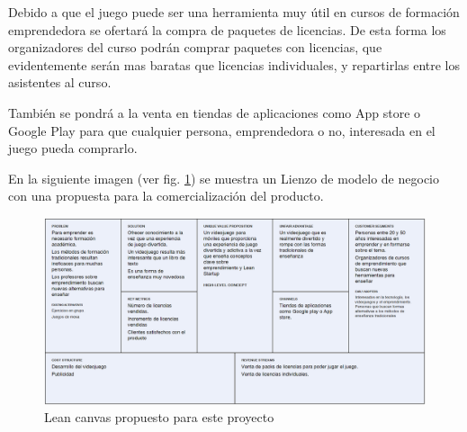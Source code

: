 Debido a que el juego puede ser una herramienta muy útil en cursos de formación emprendedora se ofertará la compra de paquetes de licencias. De esta forma los organizadores del curso podrán comprar paquetes con licencias, que evidentemente serán mas baratas que licencias individuales, y repartirlas entre los asistentes al curso. 

También se pondrá a la venta en tiendas de aplicaciones como App store o Google Play para que cualquier persona, emprendedora o no,  interesada en el juego pueda comprarlo.

En la siguiente imagen (ver fig. \ref{leanCanvasDaVinci})  se muestra un Lienzo de modelo de negocio con una propuesta para la comercialización del producto.

\begin{figure}[H]
\begin{center}
\includegraphics[scale=0.33]{imagenes/leanCanvasDaVinciStartup.png}
\caption{Lean canvas propuesto para este proyecto}
\label{leanCanvasDaVinci}
\end{center}
\end{figure}



